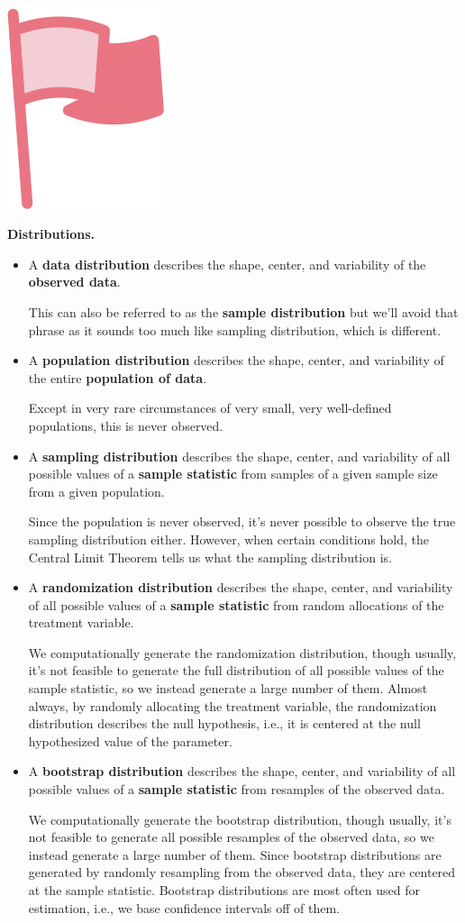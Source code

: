 \documentclass[
  10pt,
  openany]{book}
\newenvironment{mdframedwithfootImportant}
{   
    \savenotes
    \begin{mdframed}[%
    topline=true, bottomline=true, linecolor=oiR, linewidth=0.5pt,
    rightline=false, leftline=false,
    backgroundcolor=oiLGray]
    \renewcommand{\thempfootnote}{\arabic{footnote}}
    }
{
    \end{mdframed}
    \spewnotes
}
\newenvironment{important}{
    \let\oldtextbf\textbf
    \renewcommand{\textbf}[1]{{\textcolor{oiR}{\oldtextbf{##1}}}}
\vspace{4mm}
\begin{mdframedwithfootImportant}
\begin{minipage}[t]{0.10\textwidth}
{$\:$ \\ \setkeys{Gin}{width=2.5em,keepaspectratio}\includegraphics{images/_icons/important.png}}
\end{minipage}
\hfill
\begin{minipage}[t]{0.90\textwidth}
\vspace{-2mm}
\setlength{\parskip}{1em}
}{\end{minipage}
\end{mdframedwithfootImportant}
\vspace{4mm}
}
\begin{document}
\begin{important}

\textbf{Distributions.}

\begin{itemize}
\item
  A \textbf{data distribution} describes the shape, center, and variability of the \textbf{observed data}.

  This can also be referred to as the \textbf{sample distribution} but we'll avoid that phrase as it sounds too much like sampling distribution, which is different.
\item
  A \textbf{population distribution} describes the shape, center, and variability of the entire \textbf{population of data}.

  Except in very rare circumstances of very small, very well-defined populations, this is never observed.
\item
  A \textbf{sampling distribution} describes the shape, center, and variability of all possible values of a \textbf{sample statistic} from samples of a given sample size from a given population.

  Since the population is never observed, it's never possible to observe the true sampling distribution either.
  However, when certain conditions hold, the Central Limit Theorem tells us what the sampling distribution is.
\item
  A \textbf{randomization distribution} describes the shape, center, and variability of all possible values of a \textbf{sample statistic} from random allocations of the treatment variable.

  We computationally generate the randomization distribution, though usually, it's not feasible to generate the full distribution of all possible values of the sample statistic, so we instead generate a large number of them.
  Almost always, by randomly allocating the treatment variable, the randomization distribution describes the null hypothesis, i.e., it is centered at the null hypothesized value of the parameter.
\item
  A \textbf{bootstrap distribution} describes the shape, center, and variability of all possible values of a \textbf{sample statistic} from resamples of the observed data.

  We computationally generate the bootstrap distribution, though usually, it's not feasible to generate all possible resamples of the observed data, so we instead generate a large number of them.
  Since bootstrap distributions are generated by randomly resampling from the observed data, they are centered at the sample statistic.
  Bootstrap distributions are most often used for estimation, i.e., we base confidence intervals off of them.
\end{itemize}

\end{important}
\end{document}
